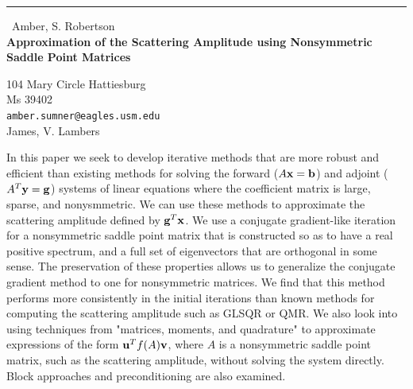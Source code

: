 \documentclass{report}
\begin{document}
\begin{center}
\rule{6in}{1pt} \
{\large Amber, S. Robertson \\
{\bf Approximation of the Scattering Amplitude using Nonsymmetric Saddle Point Matrices}}

104 Mary Circle Hattiesburg \\ Ms 39402
\\
{\tt amber.sumner@eagles.usm.edu}\\
James, V. Lambers\end{center}

In this paper we seek to develop iterative methods that are more robust
and efficient than existing methods for solving the forward ($A{\bf
x}={\bf b}$) and adjoint ($A^{T}{\bf y}={\bf g}$) systems of linear
equations where the coefficient matrix is large, sparse, and
nonysmmetric. We can use these methods to approximate the scattering
amplitude defined by ${\bf g}^{T}{\bf x}$. We use a conjugate
gradient-like iteration for a nonsymmetric saddle point matrix that is
constructed so as to have a real positive spectrum, and a full set of
eigenvectors that are orthogonal in some sense. The preservation of these
properties allows us to generalize the conjugate gradient method to one
for nonsymmetric matrices. We find that this method performs more
consistently in the initial iterations than known methods for computing
the scattering amplitude such as GLSQR or QMR. We also look into using
techniques from "matrices, moments, and quadrature" to approximate
expressions of the form ${\bf u}^{T} f(A) {\bf v}$, where $A$ is a
nonsymmetric saddle point matrix, such as the scattering amplitude,
without solving the system directly. Block approaches and preconditioning
are also examined.
\end{document}
